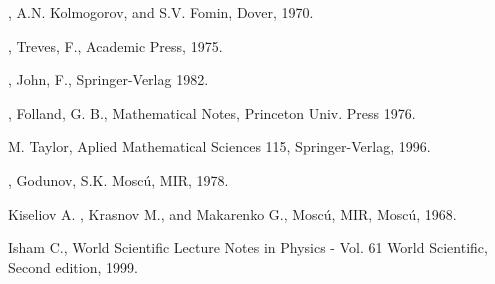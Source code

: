 \begin{thebibliography}{99}
,
                       A.N. Kolmogorov, and S.V. Fomin,
                       Dover,
                       1970.


,
                   Treves, F.,
                   Academic Press,
                   1975.

,
                 John, F.,
                 Springer-Verlag
                 1982.

,
                    Folland, G. B.,
                    Mathematical Notes, Princeton Univ. Press
                    1976.

                    M. Taylor,
                    Aplied Mathematical Sciences 115, Springer-Verlag,
                    1996.


,
                   Godunov, S.K.
                   Mosc\'u, MIR, 
                   1978.


                     Kiseliov A. ,  Krasnov M., and Makarenko G.,
                      Mosc\'u, MIR, Mosc\'u, 
                     1968.

		Isham C., World Scientific Lecture Notes in Physics - Vol. 61
		World Scientific, Second edition, 1999.

\end{thebibliography}
